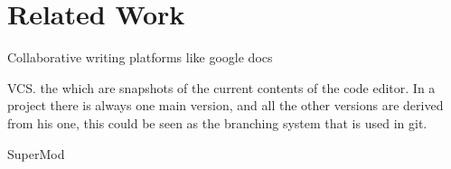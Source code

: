 

\section{Related Work}
\label{sec:related}

Collaborative writing platforms like google docs 

\ac{VCS}. the  which are snapshots of the current contents of the code editor. In a project there is always one main version, and all the other versions are derived from his one, this could be seen as the branching system that is used in git. 

SuperMod~\cite{schwagerl15}

\endinput